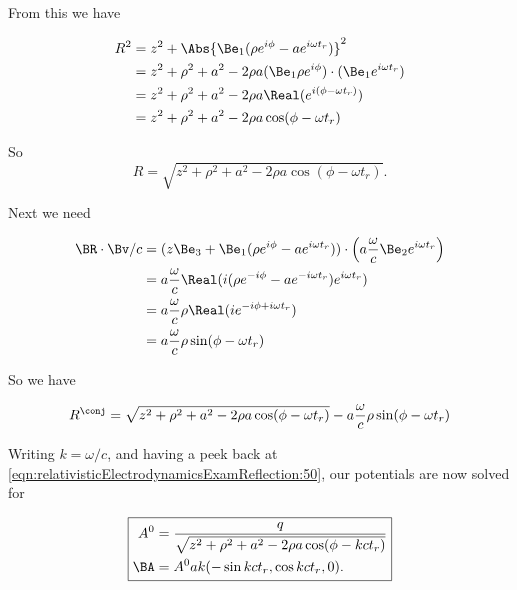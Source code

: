 From this we have

\begin{align*}
R^2 
&= z^2 + \Abs{\Be_1 (\rho e^{i \phi} - a e^{i \omega t_r} )}^2 \\
&= z^2 + \rho^2 + a^2 - 2 \rho a (\Be_1 \rho e^{i \phi}) \cdot (\Be_1 e^{i \omega t_r}) \\
&= z^2 + \rho^2 + a^2 - 2 \rho a \Real( e^{ i(\phi - \omega t_r) } ) \\
&= z^2 + \rho^2 + a^2 - 2 \rho a \cos(\phi - \omega t_r)
\end{align*}

So
\begin{equation}\label{eqn:relativisticElectrodynamicsExamReflection:130}
R = \sqrt{z^2 + \rho^2 + a^2 - 2 \rho a \cos( \phi - \omega t_r ) }.
\end{equation}

Next we need

\begin{align*}
\BR \cdot \Bv/c
&= 
(z \Be_3 + \Be_1 (\rho e^{i \phi} - a e^{i \omega t_r} )) \cdot  
\left(a \frac{\omega}{c} \Be_2 e^{i \omega t_r} \right) \\
&=
a \frac{\omega }{c}
\Real(
i (\rho e^{-i \phi} - a e^{-i \omega t_r} ) e^{i \omega t_r} ) \\
&=
a \frac{\omega }{c}
\rho \Real( i e^{-i \phi + i \omega t_r} ) \\
&=
a \frac{\omega }{c}
\rho \sin(\phi - \omega t_r)
\end{align*}

So we have

\begin{equation}\label{eqn:relativisticElectrodynamicsExamReflection:150}
R^\conj = \sqrt{z^2 + \rho^2 + a^2 - 2 \rho a \cos( \phi - \omega t_r ) }
-a \frac{\omega }{c} \rho \sin(\phi - \omega t_r)
\end{equation}

Writing $k = \omega/c$, and having a peek back at \ref{eqn:relativisticElectrodynamicsExamReflection:50}, our potentials are now solved for

\begin{equation}\label{eqn:relativisticElectrodynamicsExamReflection:500}
\boxed{
\begin{aligned}
A^0 &= \frac{q}
{\sqrt{z^2 + \rho^2 + a^2 - 2 \rho a \cos( \phi - k c t_r ) }} \\
\BA &= A^0 a k ( -\sin k c t_r, \cos k c t_r, 0).
\end{aligned}
}
\end{equation}


